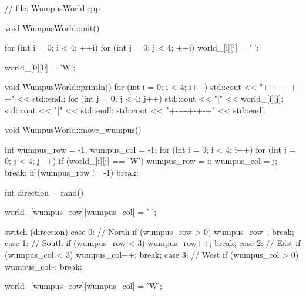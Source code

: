 \begin{answercode}
// file: WumpusWorld.cpp

void WumpusWorld::init()
{
  for (int i = 0; i < 4; ++i)
  {
    for (int j = 0; j < 4; ++j)
    {
      world_[i][j] = ' ';
    }
  }

  world_[0][0] = 'W';
}

void WumpusWorld::println()
{
  for (int i = 0; i < 4; i++)
  {
    std::cout << "+-+-+-+-+" << std::endl;
    for (int j = 0; j < 4; j++)
    {
      std::cout << "|" << world_[i][j];
    }
    std::cout << "|" << std::endl;
  }
  std::cout << "+-+-+-+-+" << std::endl;
}

void WumpusWorld::move_wumpus()
{
  int wumpus_row = -1, wumpus_col = -1;
  for (int i = 0; i < 4; i++)
  {
    for (int j = 0; j < 4; j++)
    {
      if (world_[i][j] == 'W')
      {
        wumpus_row = i;
        wumpus_col = j;
        break;
      }
    }
    if (wumpus_row != -1)
    {
      break;
    }
  }

  int direction = rand() %

  world_[wumpus_row][wumpus_col] = ' ';

  switch (direction)
  {
    case 0: // North
    if (wumpus_row > 0)
    {
      wumpus_row--;
    }
    break;
    case 1: // South
    if (wumpus_row < 3)
    {
      wumpus_row++;
    }
    break;
    case 2: // East
    if (wumpus_col < 3)
    {
      wumpus_col++;
    }
    break;
    case 3: // West
    if (wumpus_col > 0)
    {
      wumpus_col--;
    }
    break;
  }

  world_[wumpus_row][wumpus_col] = 'W';
}

\end{answercode}


